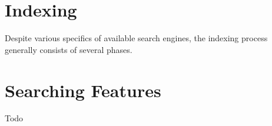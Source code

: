 \section{Indexing}

Despite various specifics of available search engines, the indexing process generally consists of several phases.
\cite{Fox:1991:FFA:903195}


\section{Searching Features}

Todo
